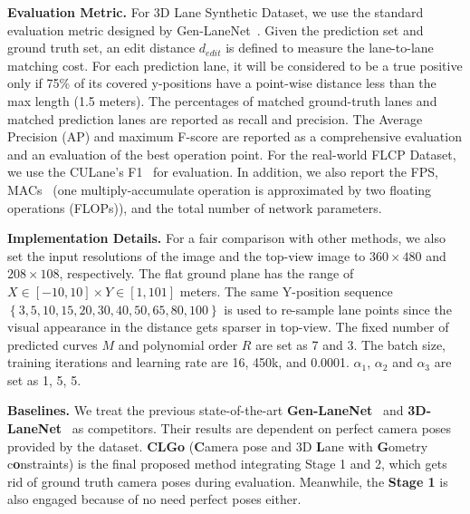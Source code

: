 \documentclass[letterpaper]{article} \usepackage{aaai22}  \usepackage{times}  \usepackage{helvet}  \usepackage{courier}  \usepackage[hyphens]{url}  \usepackage{graphicx} \urlstyle{rm} \def\UrlFont{\rm}  \usepackage{natbib}  \usepackage{caption}
\begin{document}
\noindent \textbf{Evaluation Metric.}
For 3D Lane Synthetic Dataset, we use the standard evaluation metric designed by Gen-LaneNet~\cite{GenLaneNet}. Given the prediction set and ground truth set, an edit distance $d_{edit}$ is defined to measure the lane-to-lane matching cost. 
For each prediction lane, it will be considered to be a true positive only if 75\% of its covered y-positions have a point-wise distance less than the max length (1.5 meters). The percentages of matched ground-truth lanes and matched prediction lanes are reported as recall and precision. The Average Precision (AP) and maximum F-score are reported as a comprehensive evaluation and an evaluation of the best operation point. 
For the real-world FLCP Dataset, we use the CULane's F1~\cite{SCNN} for evaluation. In addition, we also report the FPS, MACs~\cite{MACs} (one multiply-accumulate operation is approximated by two floating operations (FLOPs)), and the total number of network parameters.


\noindent \textbf{Implementation Details.}
For a fair comparison with other methods, we also set the input resolutions of the image and the top-view image to $360\times480$ and $208\times108$, respectively. The flat ground plane has the range of $X\in\left[-10, 10\right]\times Y\in\left[1, 101\right]$ meters. The same Y-position sequence $\left\{3, 5, 10, 15, 20, 30, 40, 50, 65, 80, 100\right\}$ is used to re-sample lane points since the visual appearance in the distance gets sparser in top-view. The fixed number of predicted curves $M$ and polynomial order $R$ are set as 7 and 3. 
The batch size, training iterations and learning rate are 16, 450k, and 0.0001.
$\alpha_1$, $\alpha_2$ and $\alpha_3$ are set as 1, 5, 5. 


\noindent \textbf{Baselines.}
We treat the previous state-of-the-art \textbf{Gen-LaneNet}~\cite{GenLaneNet} and \textbf{3D-LaneNet}~\cite{3DLaneNet} as competitors. Their results are dependent on perfect camera poses provided by the dataset. \textbf{CLGo} (\textbf{C}amera pose and 3D \textbf{L}ane with \textbf{G}ometry c\textbf{o}nstraints) is the final proposed method integrating Stage 1 and 2, which gets rid of ground truth camera poses during evaluation. Meanwhile, the \textbf{Stage 1} is also engaged because of no need perfect poses either.
\end{document}
